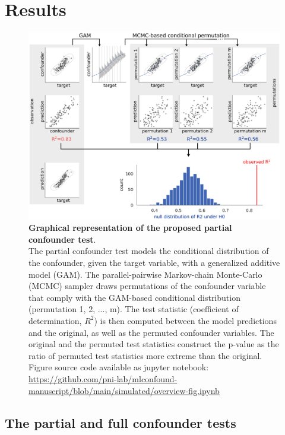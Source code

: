 \documentclass{article}
\begin{document}
\section{Results}

\begin{figure}[!b]
  \centering
  \includegraphics[width=0.6\paperwidth]{fig/overview.eps}
  \caption{\textbf{Graphical representation of the proposed partial confounder test}. \\
    The partial confounder test models the conditional distribution of the confounder, given the target variable, with a generalized additive model (GAM). The parallel-pairwise Markov-chain Monte-Carlo (MCMC) sampler draws permutations of the confounder variable that comply with the GAM-based conditional distribution (permutation 1, 2, ..., m). The test statistic (coefficient of determination, $R^2$) is then computed between the model predictions and the original, as well as the permuted confounder variables. The original and the permuted test statistics construct the p-value as the ratio of permuted test statistics more extreme than the original. Figure source code available as jupyter notebook: \href{https://github.com/pni-lab/mlconfound-manuscript/blob/main/simulated/overview-fig.ipynb}{https://github.com/pni-lab/mlconfound-manuscript/blob/main/simulated/overview-fig.ipynb}
  }
  \label{fig:overview}
\end{figure}


\subsection{The partial and full confounder tests}
\end{document}
